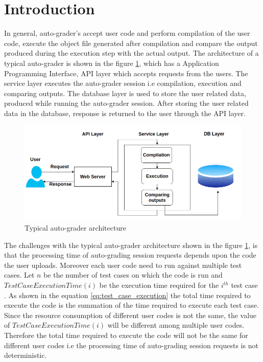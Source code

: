 \documentclass[sigconf]{acmart}
\begin{document}
\section{Introduction}

In general, auto-grader's accept user code and perform compilation of the user code, execute the object file generated after compilation and compare the output produced during the execution step with the actual output. The architecture of a typical auto-grader is shown in the figure \ref{typical_auto_grader}, which has a Application Programming Interface, API layer which accepts requests from the users. The service layer executes the auto-grader session i.e compilation, execution and comparing outputs. The database layer is used to store the user related data, produced while running the auto-grader session. After storing the user related data in the database, response is returned to the user through the API layer.
\begin{figure}[h]
  \centering
  \includegraphics[width=\linewidth]{Pictures/typical_autograder.png}
  \caption{Typical auto-grader architecture}
  \label{typical_auto_grader}
\end{figure}

The challenges with the typical auto-grader architecture shown in the figure \ref{typical_auto_grader}, is that the processing  time of auto-grading session requests depends upon the code the user uploads. Moreover each user code need to run against multiple test cases. Let $n$ be the number of test cases on which the code is run and $Test Case Execution Time(i)$ be the execution time required for the $i^{th}$ test case . As shown in the equation \ref{eq:test_case_execution} the total time required to execute the code is the summation of the time required to execute each test case. Since the resource consumption of different user codes is not the same, the value of $Test Case Execution Time(i)$  will be different among multiple user codes. Therefore the total time required to execute the code will not be the same for different user codes i.e the processing  time of auto-grading session requests is not deterministic.
\end{document}
